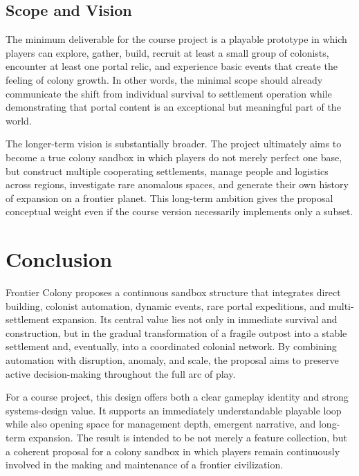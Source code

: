 \documentclass[conference]{IEEEtran}
\begin{document}
\subsection{Scope and Vision}
The minimum deliverable for the course project is a playable prototype in which players can explore, gather, build, recruit at least a small group of colonists, encounter at least one portal relic, and experience basic events that create the feeling of colony growth. In other words, the minimal scope should already communicate the shift from individual survival to settlement operation while demonstrating that portal content is an exceptional but meaningful part of the world.

The longer-term vision is substantially broader. The project ultimately aims to become a true colony sandbox in which players do not merely perfect one base, but construct multiple cooperating settlements, manage people and logistics across regions, investigate rare anomalous spaces, and generate their own history of expansion on a frontier planet. This long-term ambition gives the proposal conceptual weight even if the course version necessarily implements only a subset.

\section{Conclusion}
Frontier Colony proposes a continuous sandbox structure that integrates direct building, colonist automation, dynamic events, rare portal expeditions, and multi-settlement expansion. Its central value lies not only in immediate survival and construction, but in the gradual transformation of a fragile outpost into a stable settlement and, eventually, into a coordinated colonial network. By combining automation with disruption, anomaly, and scale, the proposal aims to preserve active decision-making throughout the full arc of play.

For a course project, this design offers both a clear gameplay identity and strong systems-design value. It supports an immediately understandable playable loop while also opening space for management depth, emergent narrative, and long-term expansion. The result is intended to be not merely a feature collection, but a coherent proposal for a colony sandbox in which players remain continuously involved in the making and maintenance of a frontier civilization.



\end{document}
